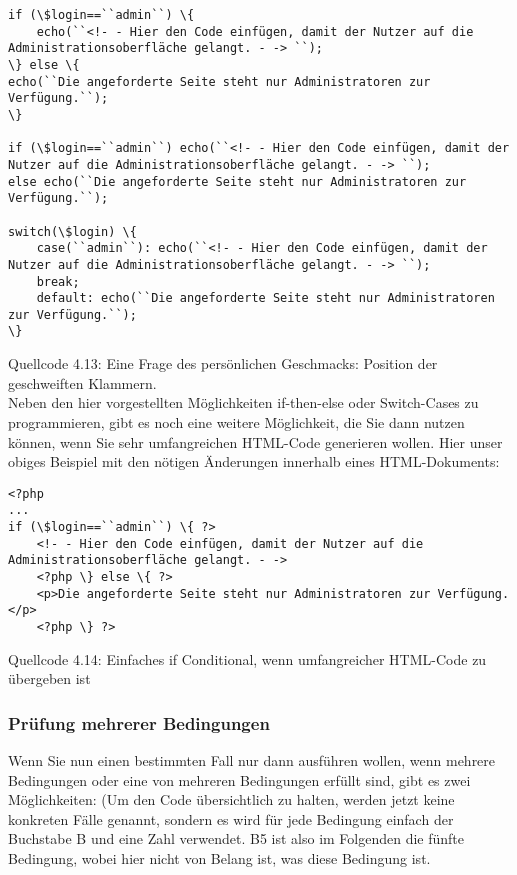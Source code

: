 \begin{verbatim}
if (\$login==``admin``) \{
	echo(``<!- - Hier den Code einfügen, damit der Nutzer auf die Administrationsoberfläche gelangt. - -> ``); 
\} else \{
echo(``Die angeforderte Seite steht nur Administratoren zur Verfügung.``);
\} 

if (\$login==``admin``) echo(``<!- - Hier den Code einfügen, damit der Nutzer auf die Administrationsoberfläche gelangt. - -> ``); 
else echo(``Die angeforderte Seite steht nur Administratoren zur Verfügung.``); 

switch(\$login) \{
	case(``admin``): echo(``<!- - Hier den Code einfügen, damit der Nutzer auf die Administrationsoberfläche gelangt. - -> ``);
	break;
	default: echo(``Die angeforderte Seite steht nur Administratoren zur Verfügung.``);
\}
\end{verbatim}
Quellcode 4.13: Eine Frage des persönlichen Geschmacks: Position der geschweiften Klammern.\\

Neben den hier vorgestellten Möglichkeiten if-then-else oder Switch-Cases zu programmieren, gibt es noch eine weitere Möglichkeit, die Sie dann nutzen können, wenn Sie sehr umfangreichen HTML-Code generieren wollen. Hier unser obiges Beispiel mit den nötigen Änderungen innerhalb eines HTML-Dokuments:\\

\begin{verbatim}
<?php
...
if (\$login==``admin``) \{ ?>
	<!- - Hier den Code einfügen, damit der Nutzer auf die Administrationsoberfläche gelangt. - ->
	<?php \} else \{ ?>
	<p>Die angeforderte Seite steht nur Administratoren zur Verfügung.</p>
	<?php \} ?>
\end{verbatim}
Quellcode 4.14: Einfaches if Conditional, wenn umfangreicher HTML-Code zu übergeben ist

\subsubsection{Prüfung mehrerer Bedingungen}

Wenn Sie nun einen bestimmten Fall nur dann ausführen wollen, wenn mehrere Bedingungen oder eine von mehreren Bedingungen erfüllt sind, gibt es zwei Möglichkeiten: (Um den Code übersichtlich zu halten, werden jetzt keine konkreten Fälle genannt, sondern es wird für jede Bedingung einfach der Buchstabe B und eine Zahl verwendet. B5 ist also im Folgenden die fünfte Bedingung, wobei hier nicht von Belang ist, was diese Bedingung ist.

